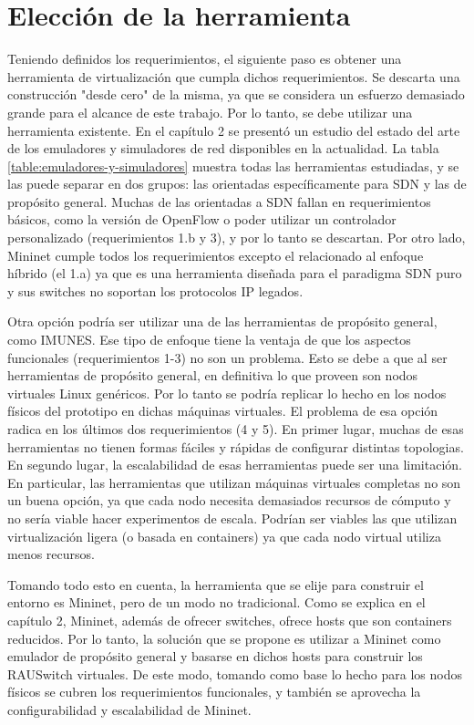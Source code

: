 \section{Elección de la herramienta}
Teniendo definidos los requerimientos, el siguiente paso es obtener una herramienta de virtualización que cumpla dichos requerimientos. Se descarta una construcción "desde cero" de la misma, ya que se considera un esfuerzo demasiado grande para el alcance de este trabajo. Por lo tanto, se debe utilizar una herramienta existente. En el capítulo 2 se presentó un estudio del estado del arte de los emuladores y simuladores de red disponibles en la actualidad. La tabla \ref{table:emuladores-y-simuladores} muestra todas las herramientas estudiadas, y se las puede separar en dos grupos: las orientadas específicamente para SDN y las de propósito general. Muchas de las orientadas a SDN fallan en requerimientos básicos, como la versión de OpenFlow o poder utilizar un controlador personalizado (requerimientos 1.b y 3), y por lo tanto se descartan. Por otro lado, Mininet cumple todos los requerimientos excepto el relacionado al enfoque híbrido (el 1.a) ya que es una herramienta diseñada para el paradigma SDN puro y sus switches no soportan los protocolos IP legados.

Otra opción podría ser utilizar una de las herramientas de propósito general, como IMUNES. Ese tipo de enfoque tiene la ventaja de que los aspectos funcionales (requerimientos 1-3) no son un problema. Esto se debe a que al ser herramientas de propósito general, en definitiva lo que proveen son nodos virtuales Linux genéricos. Por lo tanto se podría replicar lo hecho en los nodos físicos del prototipo en dichas máquinas virtuales. 
El problema de esa opción radica en los últimos dos requerimientos (4 y 5). En primer lugar, muchas de esas herramientas no tienen formas fáciles y rápidas de configurar distintas topologias. En segundo lugar, la escalabilidad de esas herramientas puede ser una limitación. En particular, las herramientas que utilizan máquinas virtuales completas no son un buena opción, ya que cada nodo necesita demasiados recursos de cómputo y no sería viable hacer experimentos de escala. Podrían ser viables las que utilizan virtualización ligera (o basada en containers) ya que cada nodo virtual utiliza menos recursos.

Tomando todo esto en cuenta, la herramienta que se elije para construir el entorno es Mininet, pero de un modo no tradicional. Como se explica en el capítulo 2, Mininet, además de ofrecer switches, ofrece hosts que son containers reducidos. Por lo tanto, la solución que se propone es utilizar a Mininet como emulador de propósito general y basarse en dichos hosts para construir los RAUSwitch virtuales. De este modo, tomando como base lo hecho para los nodos físicos se cubren los requerimientos funcionales, y también se aprovecha la configurabilidad y escalabilidad de Mininet.

